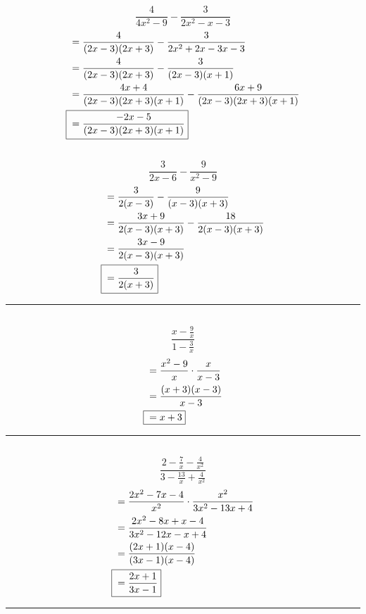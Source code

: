 	\subsection{}
		\[\frac{4}{4x^2 - 9} - \frac{3}{2x^2 - x - 3}\]
		\begin{align*}
			&= \frac{4}{(2x - 3)(2x + 3)} - \frac{3}{2x^2 + 2x - 3x - 3} \\
			&= \frac{4}{(2x - 3)(2x + 3)} - \frac{3}{(2x - 3)(x + 1)} \\
			&= \frac{4x + 4}{(2x - 3)(2x + 3)(x + 1)} - \frac{6x + 9}{(2x - 3)(2x + 3)(x + 1)} \\
			\Aboxed{{} &= \frac{-2x - 5}{(2x - 3)(2x + 3)(x + 1)}}
		\end{align*}

	\subsection{}
		\[\frac{3}{2x - 6} - \frac{9}{x^2 - 9}\]
		\begin{align*}
			&= \frac{3}{2(x - 3)} - \frac{9}{(x - 3)(x + 3)} \\
			&= \frac{3x + 9}{2(x - 3)(x + 3)} - \frac{18}{2(x - 3)(x + 3)} \\
			&= \frac{3x - 9}{2(x - 3)(x + 3)} \\
			\Aboxed{{} &= \frac{3}{2(x + 3)}}
		\end{align*}
		\hrule{}

	\subsection{}
		\[\frac{x - \frac{9}{x}}{1 - \frac{3}{x}}\]
		\begin{align*}
			&= \frac{x^2 - 9}{x} \cdot \frac{x}{x - 3} \\
			&= \frac{(x + 3)(x - 3)}{x - 3} \\
			\Aboxed{{} &= x + 3}
		\end{align*}
		\hrule{}

	\subsection{}
		\[\frac{2 - \frac{7}{x} - \frac{4}{x^2}}{3 - \frac{13}{x} + \frac{4}{x^2}}\]
		\begin{align*}
			&= \frac{2x^2 - 7x - 4}{x^2} \cdot \frac{x^2}{3x^2 - 13x + 4} \\
			&= \frac{2x^2 - 8x + x - 4}{3x^2 - 12x - x + 4} \\
			&= \frac{(2x + 1)(x - 4)}{(3x - 1)(x - 4)} \\
			\Aboxed{{} &= \frac{2x + 1}{3x - 1}}
		\end{align*}
		\hrule{}

